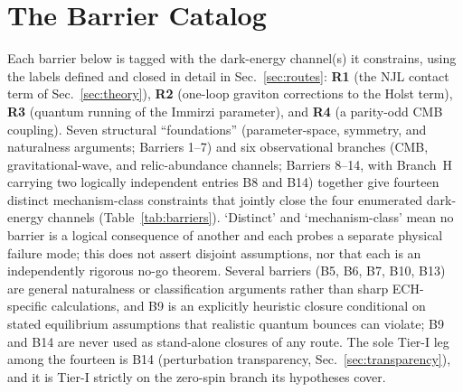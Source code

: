 \documentclass[aps,prd,twocolumn,superscriptaddress,preprintnumbers,nofootinbib,longbibliography,floatfix]{revtex4-2}
\begin{document}
\section{The Barrier Catalog}\label{sec:barriers}

Each barrier below is tagged with the dark-energy channel(s) it
constrains, using the labels defined and closed in detail in
Sec.~\ref{sec:routes}: \textbf{R1} (the NJL contact term of
Sec.~\ref{sec:theory}), \textbf{R2} (one-loop graviton corrections to
the Holst term), \textbf{R3} (quantum running of the Immirzi parameter),
and \textbf{R4} (a parity-odd CMB coupling). Seven structural ``foundations'' (parameter-space, symmetry, and
naturalness arguments; Barriers 1--7) and six observational branches
(CMB, gravitational-wave, and relic-abundance channels; Barriers 8--14,
with Branch~H carrying two logically independent entries B8 and B14)
together give fourteen distinct mechanism-class constraints that jointly
close the four enumerated dark-energy channels (Table~\ref{tab:barriers}).
`Distinct' and `mechanism-class' mean no barrier is a logical consequence
of another and each probes a separate physical failure mode; this does
not assert disjoint assumptions, nor that each is an independently
rigorous no-go theorem. Several barriers (B5, B6, B7, B10, B13) are
general naturalness or classification arguments rather than sharp
ECH-specific calculations, and B9 is an explicitly heuristic closure
conditional on stated equilibrium assumptions that realistic quantum
bounces can violate; B9 and B14 are never used as stand-alone closures of
any route. The sole Tier-I leg among the fourteen is B14 (perturbation
transparency, Sec.~\ref{sec:transparency}), and it is Tier-I strictly on
the zero-spin branch its hypotheses cover.
\end{document}
